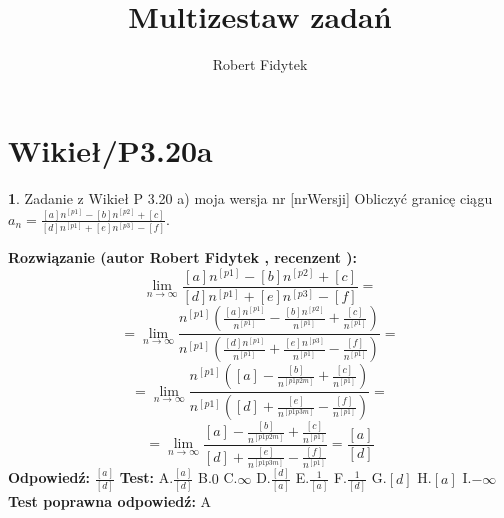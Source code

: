 \documentclass[12pt, a4paper]{article}
\title{Multizestaw zadań}
\author{Robert Fidytek}
\date{}
\theoremstyle{definition} %
\newtheorem{zad}{}
\newcommand{\kategoria}[1]{\section{#1}} %
\newcommand{\zadStart}[1]{\begin{zad}#1\newline} %
\newcommand{\zadStop}{\end{zad}}   %
\newcommand{\rozwStart}[2]{\noindent \textbf{Rozwiązanie (autor #1 , recenzent #2): }\newline} %
\newcommand{\rozwStop}{\newline}                                            %
\newcommand{\odpStart}{\noindent \textbf{Odpowiedź:}\newline}    %
\newcommand{\odpStop}{\newline}                                             %
\newcommand{\testStart}{\noindent \textbf{Test:}\newline} %
\newcommand{\testStop}{\newline} %
\newcommand{\kluczStart}{\noindent \textbf{Test poprawna odpowiedź:}\newline} %
\newcommand{\kluczStop}{\newline} %
\begin{document}
\maketitle


\kategoria{Wikieł/P3.20a}
\zadStart{Zadanie z Wikieł P 3.20 a) moja wersja nr [nrWersji]}
Obliczyć granicę ciągu $a_{n}=\frac{[a]n^{[p1]}-[b]n^{[p2]}+[c]}{[d]n^{[p1]}+[e]n^{[p3]}-[f]}$.
\zadStop
\rozwStart{Robert Fidytek}{}
$$\lim\limits_{n\to\infty}\frac{[a]n^{[p1]}-[b]n^{[p2]}+[c]}{[d]n^{[p1]}+[e]n^{[p3]}-[f]}=$$ 
$$=\lim\limits_{n\to\infty}\frac{n^{[p1]}\left(\frac{[a]n^{[p1]}}{n^{[p1]}}-\frac{[b]n^{[p2]}}{n^{[p1]}}+\frac{[c]}{n^{[p1]}}\right)}{n^{[p1]}\left(\frac{[d]n^{[p1]}}{n^{[p1]}}+\frac{[e]n^{[p3]}}{n^{[p1]}}-\frac{[f]}{n^{[p1]}}\right)}=$$ 
$$=\lim\limits_{n\to\infty}\frac{n^{[p1]}\left([a]-\frac{[b]}{n^{[p1p2m]}}+\frac{[c]}{n^{[p1]}}\right)}
{n^{[p1]}\left([d]+\frac{[e]}{n^{[p1p3m]}}-\frac{[f]}{n^{[p1]}}\right)}=$$ 
$$=\lim\limits_{n\to\infty}\frac{[a]-\frac{[b]}{n^{[p1p2m]}}+\frac{[c]}{n^{[p1]}}}{[d]+\frac{[e]}{n^{[p1p3m]}}-\frac{[f]}{n^{[p1]}}}=\frac{[a]}{[d]}$$
\rozwStop
\odpStart
$\frac{[a]}{[d]}$
\odpStop
\testStart
A.$\frac{[a]}{[d]}$
B.$0$
C.$\infty$
D.$\frac{[d]}{[a]}$
E.$\frac{1}{[a]}$
F.$\frac{1}{[d]}$
G.$[d]$
H.$[a]$
I.$-\infty$
\testStop
\kluczStart
A
\kluczStop
\end{document}
